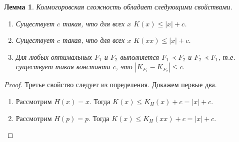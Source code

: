 \documentclass[12pt]{article}
\theoremstyle{definition}
\theoremstyle{plain}
\newtheorem{lemma}{Лемма}[section]
\theoremstyle{remark}
\begin{document}
\begin{lemma} Колмогоровская сложность обладает следующими свойствами.
\begin{enumerate}
    \item Существует $c$ такая, что для всех $x$ $K(x)\le |x| + c$. 
    \item Существует $c$ такая, что для всех $x$ $K(xx)\le |x| + c$.
    \item Для любых оптимальных $F_1$ и $F_2$ выполняется $F_1\prec F_2$ и $F_2\prec F_1$,
        т.е. существует такая константа $c$, что 
        \(
            |K_{F_1} - K_{F_2}| \le c.            
        \)
\end{enumerate}
\end{lemma}
\begin{proof} Третье свойство следует из определения. Докажем первые два.
\begin{enumerate}
    \item Рассмотрим $H(x) = x$. Тогда
        \(K(x)\le K_H(x) + c = |x| + c.\)
    \item Рассмотрим $H(p) = p$. Тогда
        \(K(x)\le K_H(xx) + c = |x| + c.\)
\end{enumerate}
\end{proof}
\end{document}
